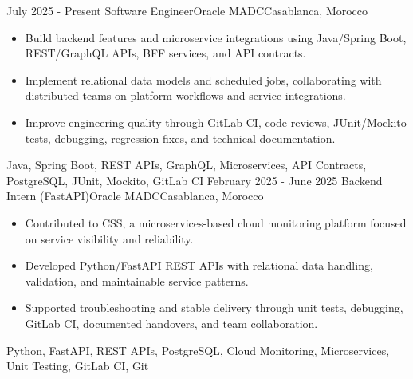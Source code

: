 
\begin{experiences}
  \experience
    {July 2025 - Present}
    {Software Engineer}{Oracle MADC}{Casablanca, Morocco}
    {} {
      \begin{itemize}
        \item Build backend features and microservice integrations using Java/Spring Boot, REST/GraphQL APIs, BFF services, and API contracts.
        \item Implement relational data models and scheduled jobs, collaborating with distributed teams on platform workflows and service integrations.
        \item Improve engineering quality through GitLab CI, code reviews, JUnit/Mockito tests, debugging, regression fixes, and technical documentation.
      \end{itemize}
    }
    {Java, Spring Boot, REST APIs, GraphQL, Microservices, API Contracts, PostgreSQL, JUnit, Mockito, GitLab CI}
  \experience
    {February 2025 - June 2025}
    {Backend Intern (FastAPI)}{Oracle MADC}{Casablanca, Morocco}
    {} {
      \begin{itemize}
        \item Contributed to CSS, a microservices-based cloud monitoring platform focused on service visibility and reliability.
        \item Developed Python/FastAPI REST APIs with relational data handling, validation, and maintainable service patterns.
        \item Supported troubleshooting and stable delivery through unit tests, debugging, GitLab CI, documented handovers, and team collaboration.
      \end{itemize}
    }
    {Python, FastAPI, REST APIs, PostgreSQL, Cloud Monitoring, Microservices, Unit Testing, GitLab CI, Git}
  \emptySeparator
\end{experiences}
